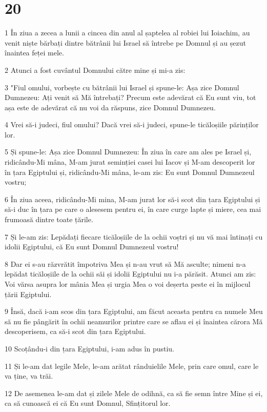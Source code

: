 \chapter{20}

\par 1 În ziua a zecea a lunii a cincea din anul al șaptelea al robiei lui Ioiachim, au venit niște bărbați dintre bătrânii lui Israel să întrebe pe Domnul și au șezut înaintea feței mele.
\par 2 Atunci a fost cuvântul Domnului către mine și mi-a zis:
\par 3 "Fiul omului, vorbește cu bătrânii lui Israel și spune-le: Așa zice Domnul Dumnezeu: Ați venit să Mă întrebați? Precum este adevărat că Eu sunt viu, tot așa este de adevărat că nu voi da răspuns, zice Domnul Dumnezeu.
\par 4 Vrei să-i judeci, fiul omului? Dacă vrei să-i judeci, spune-le ticăloșiile părinților lor.
\par 5 Și spune-le: Așa zice Domnul Dumnezeu: În ziua în care am ales pe Israel și, ridicându-Mi mâna, M-am jurat seminției casei lui Iacov și M-am descoperit lor în țara Egiptului și, ridicându-Mi mâna, le-am zis: Eu sunt Domnul Dumnezeul vostru;
\par 6 În ziua aceea, ridicându-Mi mina, M-am jurat lor să-i scot din țara Egiptului și să-i duc în țara pe care o alesesem pentru ei, în care curge lapte și miere, cea mai frumoasă dintre toate țările.
\par 7 Și le-am zis: Lepădați fiecare ticăloșiile de la ochii voștri și nu vă mai întinați cu idolii Egiptului, că Eu sunt Domnul Dumnezeul vostru!
\par 8 Dar ei s-au răzvrătit împotriva Mea și n-au vrut să Mă asculte; nimeni n-a lepădat ticăloșiile de la ochii săi și idolii Egiptului nu i-a părăsit. Atunci am zis: Voi vărsa asupra lor mânia Mea și urgia Mea o voi deșerta peste ei în mijlocul țării Egiptului.
\par 9 Însă, dacă i-am scos din țara Egiptului, am făcut aceasta pentru ca numele Meu să nu fie pângărit în ochii neamurilor printre care se aflau ei și înaintea cărora Mă descoperisem, ca să-i scot din țara Egiptului.
\par 10 Scoțându-i din țara Egiptului, i-am adus în pustiu.
\par 11 Și le-am dat legile Mele, le-am arătat rânduielile Mele, prin care omul, care le va ține, va trăi.
\par 12 De asemenea le-am dat și zilele Mele de odihnă, ca să fie semn între Mine și ei, ca să cunoască ei că Eu sunt Domnul, Sfințitorul lor.
